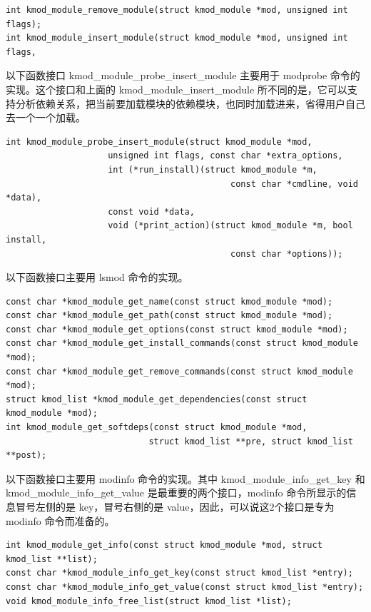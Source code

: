 {\begin{shaded}\begin{verbatim}
int kmod_module_remove_module(struct kmod_module *mod, unsigned int flags);
int kmod_module_insert_module(struct kmod_module *mod, unsigned int flags,
\end{verbatim}\end{shaded}}
以下函数接口 kmod\_module\_probe\_insert\_module 主要用于 modprobe
命令的实现。这个接口和上面的 kmod\_module\_insert\_module
所不同的是，它可以支持分析依赖关系，把当前要加载模块的依赖模块，也同时加载进来，省得用户自己去一个一个加载。

{\begin{shaded}\begin{verbatim}
int kmod_module_probe_insert_module(struct kmod_module *mod,
                    unsigned int flags, const char *extra_options,
                    int (*run_install)(struct kmod_module *m,
                                            const char *cmdline, void *data),
                    const void *data,
                    void (*print_action)(struct kmod_module *m, bool install,
                                            const char *options));
\end{verbatim}\end{shaded}}
以下函数接口主要用 lsmod 命令的实现。

{\begin{shaded}\begin{verbatim}
const char *kmod_module_get_name(const struct kmod_module *mod);
const char *kmod_module_get_path(const struct kmod_module *mod);
const char *kmod_module_get_options(const struct kmod_module *mod);
const char *kmod_module_get_install_commands(const struct kmod_module *mod);
const char *kmod_module_get_remove_commands(const struct kmod_module *mod);
struct kmod_list *kmod_module_get_dependencies(const struct kmod_module *mod);
int kmod_module_get_softdeps(const struct kmod_module *mod,
                            struct kmod_list **pre, struct kmod_list **post);
\end{verbatim}\end{shaded}}
以下函数接口主要用 modinfo 命令的实现。其中 kmod\_module\_info\_get\_key
和 kmod\_module\_info\_get\_value 是最重要的两个接口，modinfo
命令所显示的信息冒号左侧的是 key，冒号右侧的是
value，因此，可以说这2个接口是专为 modinfo 命令而准备的。

{\begin{shaded}\begin{verbatim}
int kmod_module_get_info(const struct kmod_module *mod, struct kmod_list **list);
const char *kmod_module_info_get_key(const struct kmod_list *entry);
const char *kmod_module_info_get_value(const struct kmod_list *entry);
void kmod_module_info_free_list(struct kmod_list *list);
\end{verbatim}\end{shaded}}
